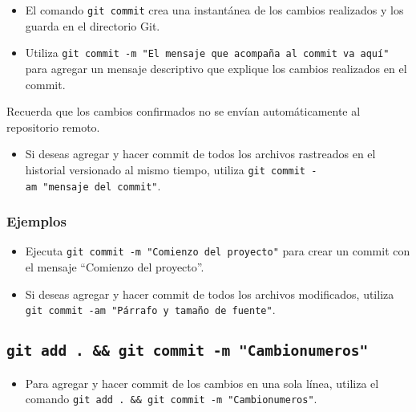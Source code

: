 \documentclass[
  letterpaper,
  DIV=11,
  numbers=noendperiod]{scrartcl}
\providecommand{\tightlist}{%
  \setlength{\itemsep}{0pt}\setlength{\parskip}{0pt}}\usepackage{longtable,booktabs,array}
\begin{document}
\begin{itemize}
\item
  El comando \texttt{git\ commit} crea una instantánea de los cambios
  realizados y los guarda en el directorio Git.
\item
  Utiliza
  \texttt{git\ commit\ -m\ "El\ mensaje\ que\ acompaña\ al\ commit\ va\ aquí"}
  para agregar un mensaje descriptivo que explique los cambios
  realizados en el commit.
\end{itemize}

Recuerda que los cambios confirmados no se envían automáticamente al
repositorio remoto.

\begin{itemize}
\tightlist
\item
  Si deseas agregar y hacer commit de todos los archivos rastreados en
  el historial versionado al mismo tiempo, utiliza
  \texttt{git\ commit\ -am\ "mensaje\ del\ commit"}.
\end{itemize}

\hypertarget{ejemplos-2}{%
\subsubsection{Ejemplos}\label{ejemplos-2}}

\begin{itemize}
\item
  Ejecuta \texttt{git\ commit\ -m\ "Comienzo\ del\ proyecto"} para crear
  un commit con el mensaje ``Comienzo del proyecto''.
\item
  Si deseas agregar y hacer commit de todos los archivos modificados,
  utiliza \texttt{git\ commit\ -am\ "Párrafo\ y\ tamaño\ de\ fuente"}.
\end{itemize}

\hypertarget{git-add-.-git-commit--m-cambionumeros}{%
\subsection{\texorpdfstring{\texttt{git\ add\ .\ \&\&\ git\ commit\ -m\ "Cambionumeros"}}{git add . \&\& git commit -m "Cambionumeros"}}\label{git-add-.-git-commit--m-cambionumeros}}

\begin{itemize}
\tightlist
\item
  Para agregar y hacer commit de los cambios en una sola línea, utiliza
  el comando
  \texttt{git\ add\ .\ \&\&\ git\ commit\ -m\ "Cambionumeros"}.
\end{itemize}
\end{document}
